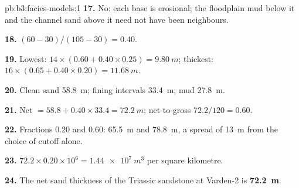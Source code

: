 \begin{solution}{pb:b3:facies-models:1}
\textbf{17.} No: each base is erosional; the floodplain mud below it and the
channel sand above it need not have been neighbours.

\textbf{18.} $(60 - 30)/(105 - 30) = 0.40$.

\textbf{19.} Lowest: $14\times(0.60 + 0.40\times0.25) = \qty{9.80}{m}$;
thickest: $16\times(0.65 + 0.40\times0.20) = \qty{11.68}{m}$.

\textbf{20.} Clean sand \qty{58.8}{m}; fining intervals \qty{33.4}{m}; mud
\qty{27.8}{m}.

\textbf{21.} Net $= 58.8 + 0.40\times33.4 = \qty{72.2}{m}$; net-to-gross
$72.2/120 = 0.60$.

\textbf{22.} Fractions 0.20 and 0.60: \qty{65.5}{m} and \qty{78.8}{m}, a
spread of \qty{13}{m} from the choice of cutoff alone.

\textbf{23.} $72.2\times0.20\times10^6 = \qty{1.44e7}{m^3}$ per square
kilometre.

\textbf{24.} The net sand thickness of the Triassic sandstone at Varden-2 is
\textbf{\qty[text-series-to-math=true]{72.2}{m}}.
\end{solution}
